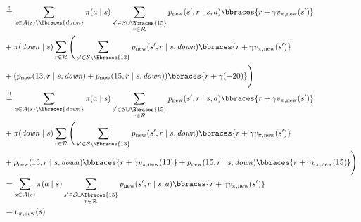 \begin{solution}
\begin{enumerate}[label = \arabic*.]
\begin{align*}
        & \stackrel{!}{=}
        \sum_{a \in \mathcal A(s) \setminus \Bbraces{\mathit{down}}}
            \pi(a \mid s)
            \sum_{\substack{s^\prime \in \mathcal S \cup \Bbraces{15} \\ r \in \mathcal R}}
                p_\text{new}(s^\prime, r \mid s, a)
                \bbraces{r + \gamma v_{\pi, \text{new}}(s^\prime)} \\
        & +
        \pi(\mathit{down} \mid s)
        \sum_{r \in \mathcal R}
            \Bigg (
                \sum_{s^\prime \in \mathcal S \setminus \Bbraces{13}}
                    p_\text{new}(s^\prime, r \mid s, \mathit{down})
                    \bbraces{r + \gamma v_{\pi, \text{new}}(s^\prime)} \\
                & +
                (
                    p_\text{new}(13, r \mid s, \mathit{down})
                    +
                    p_\text{new}(15, r \mid s, \mathit{down})
                )
                \bbraces{r + \gamma (-20)}
            \Bigg ) \\
        & \stackrel{!!}{=}
        \sum_{a \in \mathcal A(s) \setminus \Bbraces{\mathit{down}}}
            \pi(a \mid s)
            \sum_{\substack{s^\prime \in \mathcal S \cup \Bbraces{15} \\ r \in \mathcal R}}
                p_\text{new}(s^\prime, r \mid s, a)
                \bbraces{r + \gamma v_{\pi, \text{new}}(s^\prime)} \\
        & +
        \pi(\mathit{down} \mid s)
        \sum_{r \in \mathcal R}
            \Bigg (
                \sum_{s^\prime \in \mathcal S \setminus \Bbraces{13}}
                    p_\text{new}(s^\prime, r \mid s, \mathit{down})
                    \bbraces{r + \gamma v_{\pi, \text{new}}(s^\prime)} \\
                & +
                p_\text{new}(13, r \mid s, \mathit{down})
                \bbraces{r + \gamma v_{\pi, \text{new}}(13)}
                +
                p_\text{new}(15, r \mid s, \mathit{down})
                \bbraces{r + \gamma v_{\pi, \text{new}}(15)}
            \Bigg ) \\
        & =
        \sum_{a \in \mathcal A(s)}
            \pi(a \mid s)
            \sum_{\substack{s^\prime \in \mathcal S \cup \Bbraces{15} \\ r \in \mathcal R}}
                p_\text{new}(s^\prime, r \mid s, a)
                \bbraces{r + \gamma v_{\pi, \text{new}}(s^\prime)} \\
        & =
        v_{\pi, \text{new}}(s)
    \end{align*}


\end{enumerate}
\end{solution}

